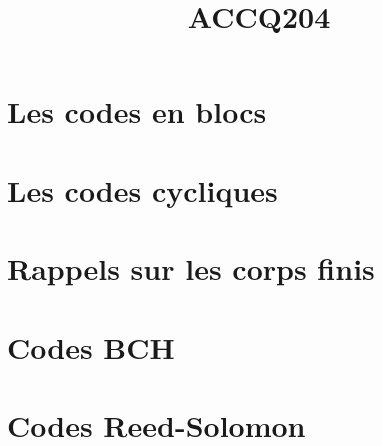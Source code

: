 \documentclass[a4paper,9pt]{article}
\title{\vspace{-1.2cm} \textbf{ACCQ204}}
\begin{document}
\maketitle

\vspace{-1.5cm}

\section{Les codes en blocs}

	

\section{Les codes cycliques}

	

\section{Rappels sur les corps finis}

	

\section{Codes BCH}

	

\section{Codes Reed-Solomon}

	
\end{document}
